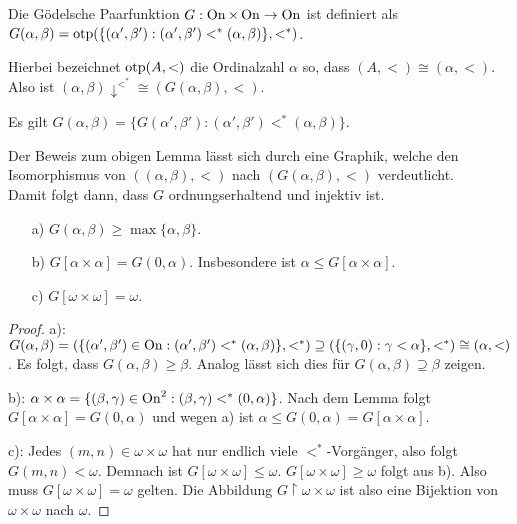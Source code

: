 \begin{definition}
	Die Gödelsche Paarfunktion $G:\operatorname{On}\times \operatorname{On}\to \operatorname{On}$ ist definiert als $G(\alpha,\beta)=\operatorname{otp}(\{(\alpha',\beta') : (\alpha',\beta')<^\ast(\alpha,\beta)\}, <^\ast)$. 
	
	Hierbei bezeichnet $\operatorname{otp}(A, <)$ die Ordinalzahl $\alpha$ so, dass $(A,<)\cong(\alpha,<)$. Also ist $(\alpha,\beta)\downarrow^{<^\ast}\cong(G(\alpha,\beta), <)$.
\end{definition}

\begin{lemma}
	Es gilt $G(\alpha,\beta)=\{G(\alpha',\beta'):(\alpha',\beta')<^\ast(\alpha,\beta)\}$.
\end{lemma}
Der Beweis zum obigen Lemma lässt sich durch eine Graphik, welche den Isomorphismus von $((\alpha,\beta),<)$ nach $(G(\alpha,\beta), <)$ verdeutlicht.
\\
Damit folgt dann, dass $G$ ordnungserhaltend und injektiv ist.

\begin{lemma}
	\begin{itemize}
		\item[a)] $G(\alpha, \beta)\geq\max\{\alpha,\beta\}$.
		\item[b)] $G[\alpha\times\alpha]=G(0,\alpha)$. Insbesondere ist $\alpha \leq G[\alpha\times\alpha]$.
		\item[c)] $G[\omega\times\omega]=\omega$.
	\end{itemize}
\end{lemma}
\begin{proof}
	a): $G(\alpha,\beta)=(\{(\alpha',\beta')\in \operatorname{On} : (\alpha',\beta')<^\ast(\alpha,\beta)\}, <^\ast) \supseteq (\{(\gamma,0):\gamma<\alpha\}, <^\ast)\cong(\alpha,<)$. Es folgt, dass $G(\alpha,\beta)\geq\beta$. Analog lässt sich dies für $G(\alpha,\beta)\supseteq\beta$ zeigen.
	
	b): $\alpha\times\alpha=\{(\beta,\gamma)\in \operatorname{On}^2 : (\beta,\gamma)<^\ast(0,\alpha)\}$. Nach dem Lemma folgt $G[\alpha\times\alpha]=G(0,\alpha)$ und wegen a) ist $\alpha\leq G(0,\alpha)=G[\alpha\times \alpha]$.
	
	c): Jedes $(m,n)\in\omega\times\omega$ hat nur endlich viele $<^\ast$-Vorgänger, also folgt $G(m,n)<\omega$. Demnach ist $G[\omega\times\omega]\leq\omega$. $G[\omega\times\omega]\geq\omega$ folgt aus b). Also muss $G[\omega\times\omega]=\omega$ gelten. Die Abbildung $G\upharpoonright\omega\times\omega$ ist also eine Bijektion von $\omega\times\omega$ nach $\omega$.
\end{proof}

